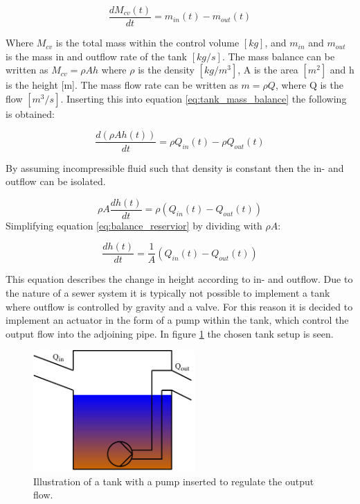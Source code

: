 \begin{equation}
	 	\frac{dM_{cv}(t)}{dt}=m_{in}(t)-m_{o ut}(t)
\label{eq:tank_mass_balance}
\end{equation} 

Where $M_{cv}$ is the total mass within the control volume $\left[kg\right]$, and $m_{in}$ and $m_{out}$ is the mass in and outflow rate of the tank $\left[kg/s\right]$. The mass balance can be written as $M_{cv} = \rho Ah$ where $\rho$ is the density $\left[kg/m^3 \right]$, A is the area $\left[m^2\right]$ and h is the height [m]. The mass flow rate can be written as $m = \rho Q$, where Q is the flow $\left[ m^3/s \right]$. Inserting this into equation \ref{eq:tank_mass_balance} the following is obtained:

\begin{equation}
		\frac{d(\rho Ah(t))}{dt}=\rho Q_{in}(t)-\rho Q_{out}(t)
\end{equation}

By assuming incompressible fluid such that density is constant then the in- and outflow can be isolated.

\begin{equation}\label{eq:balance_reservior}
	\rho A\frac{dh(t)}{dt}=\rho \left(Q_{in}(t)-Q_{out}(t)\right)
\end{equation}
Simplifying equation \ref{eq:balance_reservior} by dividing with $\rho A$:

\begin{equation}\label{eq:balance_reserviorv2}
	\frac{dh(t)}{dt}=\frac{1}{A} \left(Q_{in}(t)-Q_{out}(t)\right)
\end{equation}

This equation describes the change in height according to in- and outflow. Due to the nature of a sewer system it is typically not possible to implement a tank where outflow is controlled by gravity and a valve. For this reason it is decided to implement an actuator in the form of a pump within the tank, which control the output flow into the adjoining pipe.
In figure \ref{fig:reservior_with_pump} the chosen tank setup is seen.

\begin{figure}[H]
	\centering
	\includegraphics[width=0.55\textwidth]{report/modeling/pictures/reservior_with_pump}
	\caption{Illustration of a tank with a pump inserted to regulate the output flow.}
	\label{fig:reservior_with_pump}
\end{figure}

